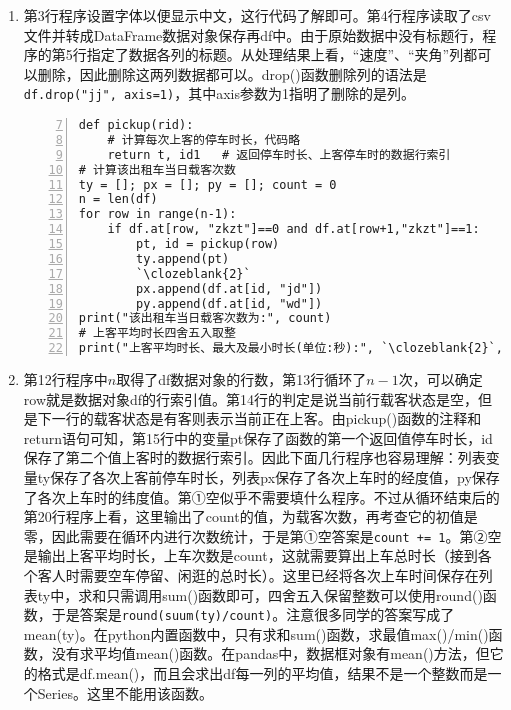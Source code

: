 \begin{enumerate}
	\begin{enumerate}[label=$(\arabic*)$]
\setcounter{qnumber}{1}
\begin{lstlisting}
109, 2007-02-20 00:07:10, 121.443100, 31.273000,  0, 45, 0
109, 2007-02-20 00:08:06, 121.447600, 31.272000,  6, 22, 1
109, 2007-02-20 00:09:07, 121.452500, 31.271000, 46, 67, 1
\end{lstlisting}
\begin{lstlisting}[numbers=left]
import pandas as pd
import matplotlib.pyplot as plt             # 导入matplotlib模块
plt.rcParams["font.sans-serif"] = ["KaiTi"] # 图表中中文以楷体显示
df = pd.read_csv("Taxi_105.txt", sep=",")
df.columns = ["xh", "sk", "jd", "wd", "sd", "jj", "zkzt"]
df = `\underline{\hspace*{4cm}}`
\end{lstlisting}
	\item 第3行程序设置字体以便显示中文，这行代码了解即可。第4行程序读取了csv文件并转成DataFrame数据对象保存再df中。由于原始数据中没有标题行，程序的第5行指定了数据各列的标题。从处理结果上看，“速度”、“夹角”列都可以删除，因此删除这两列数据都可以。drop()函数删除列的语法是\lstinline|df.drop("jj", axis=1)|，其中axis参数为1指明了删除的是列。
\begin{lstlisting}[numbers=left, firstnumber=7]
def pickup(rid):
    # 计算每次上客的停车时长，代码略
    return t, id1 	# 返回停车时长、上客停车时的数据行索引
# 计算该出租车当日载客次数
ty = []; px = []; py = []; count = 0
n = len(df)
for row in range(n-1):
    if df.at[row, "zkzt"]==0 and df.at[row+1,"zkzt"]==1: 	# 上客
        pt, id = pickup(row)
        ty.append(pt) 
        `\clozeblank{2}`
        px.append(df.at[id, "jd"])
        py.append(df.at[id, "wd"])        
print("该出租车当日载客次数为:", count)
# 上客平均时长四舍五入取整
print("上客平均时长、最大及最小时长(单位:秒):", `\clozeblank{2}`, max(ty), min(ty))
\end{lstlisting}
	\item 第12行程序中$n$取得了df数据对象的行数，第13行循环了$n-1$次，可以确定row就是数据对象df的行索引值。第14行的判定是说当前行载客状态是空，但是下一行的载客状态是有客则表示当前正在上客。由pickup()函数的注释和return语句可知，第15行中的变量pt保存了函数的第一个返回值停车时长，id保存了第二个值上客时的数据行索引。因此下面几行程序也容易理解：列表变量ty保存了各次上客前停车时长，列表px保存了各次上车时的经度值，py保存了各次上车时的纬度值。第①空似乎不需要填什么程序。不过从循环结束后的第20行程序上看，这里输出了count的值，为载客次数，再考查它的初值是零，因此需要在循环内进行次数统计，于是第①空答案是\lstinline|count += 1|。第②空是输出上客平均时长，上车次数是count，这就需要算出上车总时长（接到各个客人时需要空车停留、闲逛的总时长）。这里已经将各次上车时间保存在列表ty中，求和只需调用sum()函数即可，四舍五入保留整数可以使用round()函数，于是答案是\lstinline|round(suum(ty)/count)|。注意很多同学的答案写成了mean(ty)。在python内置函数中，只有求和sum()函数，求最值max()/min()函数，没有求平均值mean()函数。在pandas中，数据框对象有mean()方法，但它的格式是df.mean()，而且会求出df每一列的平均值，结果不是一个整数而是一个Series。这里不能用该函数。

\end{enumerate}
\end{enumerate}
